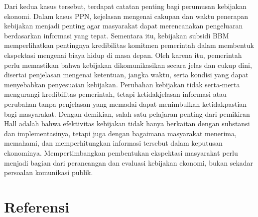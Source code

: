 \documentclass[
  manuscript=article,
  layout=brief,
  year=2026,
  volume=1,
]{den}
\begin{document}
Dari kedua kasus tersebut, terdapat catatan penting bagi perumusan
kebijakan ekonomi. Dalam kasus PPN, kejelasan mengenai cakupan dan waktu
penerapan kebijakan menjadi penting agar masyarakat dapat merencanakan
pengeluaran berdasarkan informasi yang tepat. Sementara itu, kebijakan
subsidi BBM memperlihatkan pentingnya kredibilitas komitmen pemerintah
dalam membentuk ekspektasi mengenai biaya hidup di masa depan. Oleh
karena itu, pemerintah perlu memastikan bahwa kebijakan dikomunikasikan
secara jelas dan cukup dini, disertai penjelasan mengenai ketentuan,
jangka waktu, serta kondisi yang dapat menyebabkan penyesuaian
kebijakan. Perubahan kebijakan tidak serta-merta mengurangi kredibilitas
pemerintah, tetapi ketidakjelasan informasi atau perubahan tanpa
penjelasan yang memadai dapat menimbulkan ketidakpastian bagi
masyarakat. Dengan demikian, salah satu pelajaran penting dari pemikiran
Hall adalah bahwa efektivitas kebijakan tidak hanya berkaitan dengan
substansi dan implementasinya, tetapi juga dengan bagaimana masyarakat
menerima, memahami, dan memperhitungkan informasi tersebut dalam
keputusan ekonominya. Mempertimbangkan pembentukan ekspektasi masyarakat
perlu menjadi bagian dari perancangan dan evaluasi kebijakan ekonomi,
bukan sekadar persoalan komunikasi publik.

\section*{Referensi}\label{referensi}
\end{document}
